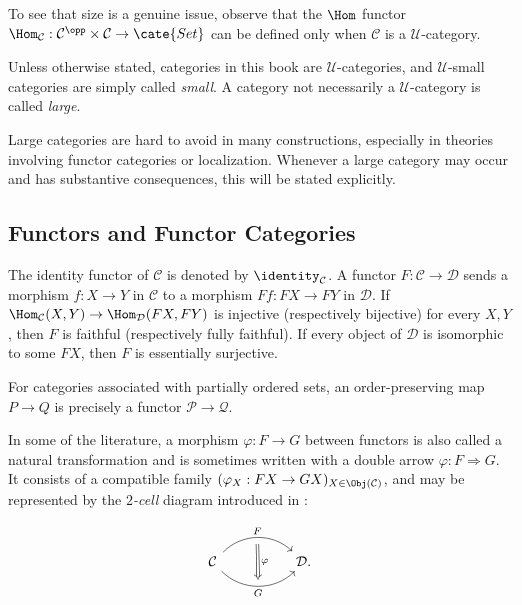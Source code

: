 To see that size is a genuine issue, observe that the $\Hom$ functor $\Hom_{\mathcal C}:\mathcal C^{\opp}\times\mathcal C\to\cate{Set}$ can be defined only when $\mathcal C$ is a $\mathcal U$-category.

Unless otherwise stated, categories in this book are $\mathcal U$-categories, and $\mathcal U$-small categories are simply called \emph{small}. A category not necessarily a $\mathcal U$-category is called \emph{large}.

Large categories are hard to avoid in many constructions, especially in theories involving functor categories or localization. Whenever a large category may occur and has substantive consequences, this will be stated explicitly.

\subsection*{Functors and Functor Categories}

The identity functor of $\mathcal C$ is denoted by $\identity_{\mathcal C}$. A functor $F:\mathcal C\to\mathcal D$ sends a morphism $f:X\to Y$ in $\mathcal C$ to a morphism $Ff:FX\to FY$ in $\mathcal D$. If $\Hom_{\mathcal C}(X,Y)\to\Hom_{\mathcal D}(FX,FY)$ is injective (respectively bijective) for every $X,Y$, then $F$ is faithful (respectively fully faithful). If every object of $\mathcal D$ is isomorphic to some $FX$, then $F$ is essentially surjective.

For categories associated with partially ordered sets, an order-preserving map $P\to Q$ is precisely a functor $\mathcal P\to\mathcal Q$.

In some of the literature, a morphism $\varphi:F\to G$ between functors is also called a natural transformation and is sometimes written with a double arrow $\varphi:F\Rightarrow G$. It consists of a compatible family $(\varphi_X:FX\to GX)_{X\in\Obj(\mathcal C)}$, and may be represented by the \emph{$2$-cell} diagram introduced in \cite[\S~2.2]{Li1}:

\[\begin{tikzcd}
	\mathcal{C} \arrow[rr, bend left=45, "F", ""'{name=F}] \arrow[rr, bend right=45, "G"', ""{name=G}] & & \mathcal{D} \arrow[Rightarrow, from=F, to=G, "\varphi"].
\end{tikzcd}\]

